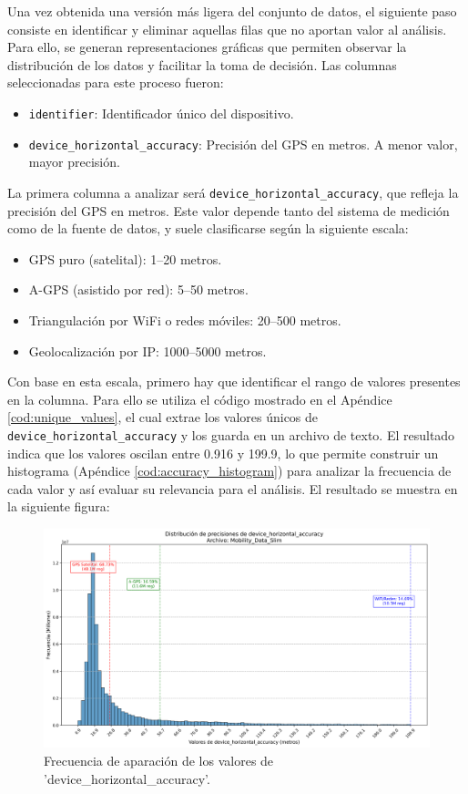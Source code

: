 Una vez obtenida una versión más ligera del conjunto de datos, el siguiente paso consiste en identificar y eliminar aquellas filas que no aportan valor al análisis. Para ello, se generan representaciones gráficas que permiten observar la distribución de los datos y facilitar la toma de decisión. Las columnas seleccionadas para este proceso fueron:

\begin{itemize}
    \item \texttt{identifier}: Identificador único del dispositivo.
    \item \texttt{device\_horizontal\_accuracy}: Precisión del GPS en metros. A menor valor, mayor precisión.
\end{itemize}

La primera columna a analizar será \texttt{device\_horizontal\_accuracy}, que refleja la precisión del GPS en metros. Este valor depende tanto del sistema de medición como de la fuente de datos, y suele clasificarse según la siguiente escala:

\begin{itemize}
    \item GPS puro (satelital): 1–20 metros.
    \item A-GPS (asistido por red): 5–50 metros.
    \item Triangulación por WiFi o redes móviles: 20–500 metros.
    \item Geolocalización por IP: 1000–5000 metros.
\end{itemize}

Con base en esta escala,  primero hay que identificar el rango de valores presentes en la columna. Para ello se utiliza el código mostrado en el Apéndice \ref{cod:unique_values}, el cual extrae los valores únicos de \texttt{device\_horizontal\_accuracy} y los guarda en un archivo de texto. El resultado indica que los valores oscilan entre 0.916 y 199.9, lo que permite construir un histograma (Apéndice \ref{cod:accuracy_histogram}) para analizar la frecuencia de cada valor y así evaluar su relevancia para el análisis. El resultado se muestra en la siguiente figura:

\begin{figure}[H]
    \centering
    \includegraphics[width=\textwidth]{img/histograma_device_horizontal_accuracy_Mobility_Data_Slim.png}
    \caption{Frecuencia de aparación de los valores de 'device\_horizontal\_accuracy'.}
    \label{fig:accuracy_histogram}
\end{figure}

